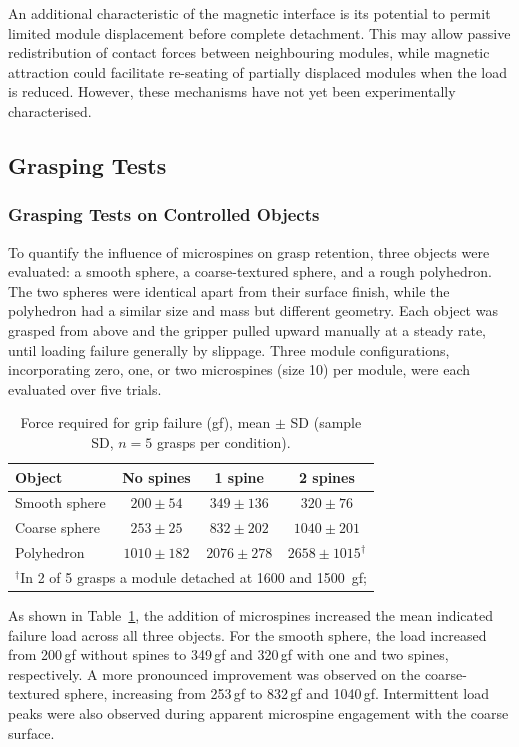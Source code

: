 \documentclass[letterpaper, 10 pt, conference, twoside]{ieeetran}
\begin{document}
An additional characteristic of the magnetic interface is its potential to permit limited module displacement before complete detachment. This may allow passive redistribution of contact forces between neighbouring modules, while magnetic attraction could facilitate re-seating of partially displaced modules when the load is reduced. However, these mechanisms have not yet been experimentally characterised.


\subsection{Grasping Tests}
\subsubsection{Grasping Tests on Controlled Objects}

To quantify the influence of microspines on grasp retention, three objects were evaluated: a smooth sphere, a coarse-textured sphere, and a rough polyhedron. The two spheres were identical apart from their surface finish, while the polyhedron had a similar size and mass but different geometry. Each object was grasped from above and the gripper pulled upward manually at a steady rate, until loading failure generally by slippage. Three module configurations, incorporating zero, one, or two microspines (size 10) per module, were each evaluated over five trials.

\begin{table}[t]
\caption{Force required for grip failure (gf), mean $\pm$ SD (sample SD, $n=5$ grasps per condition).}
\label{tab:spine_force}
\centering
\begin{tabular}{lccc}
\toprule
Object & No spines & 1 spine & 2 spines \\
\midrule
Smooth sphere & $200 \pm 54$   & $349 \pm 136$  & $320 \pm 76$ \\
Coarse sphere & $253 \pm 25$   & $832 \pm 202$  & $1040 \pm 201$ \\
Polyhedron    & $1010 \pm 182$ & $2076 \pm 278$ & $2658 \pm 1015^{\dagger}$ \\
\bottomrule
\multicolumn{4}{l}{\footnotesize $^{\dagger}$In 2 of 5 grasps a module detached at 1600 and 1500~gf;}\\
\end{tabular}
\end{table}

As shown in Table~\ref{tab:spine_force}, the addition of microspines increased the mean indicated failure load across all three objects. For the smooth sphere, the load increased from 200\,gf without spines to 349\,gf and 320\,gf with one and two spines, respectively. A more pronounced improvement was observed on the coarse-textured sphere, increasing from 253\,gf to 832\,gf and 1040\,gf. Intermittent load peaks were also observed during apparent microspine engagement with the coarse surface.
\end{document}
